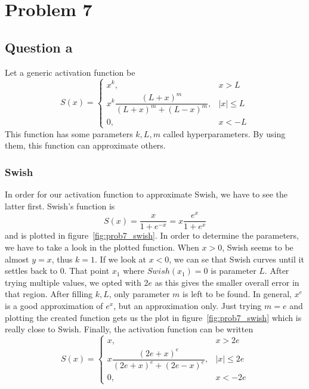\section{Problem 7}
\subsection{Question a}
Let a generic activation function be
\begin{equation}
S(x) = \left\{
\begin{array}{cc}
	x^k, & x>L\\[1mm]
	x^k \dfrac{\left(L+x\right)^m}{\left(L+x\right)^m + \left(L-x\right)^m}, & \left|x\right| \le L\\[1mm]
	0, & x < -L
\end{array}
\right.
\end{equation}
This function has some parameters $k,L,m$ called hyperparameters. By using them, this function can approximate others.

\subsubsection{Swish}
In order for our activation function to approximate Swish, we have to see the latter first.
Swish's function is 
\[
S(x) = \dfrac{x}{1+e^{-x}} = x\dfrac{e^x}{1+e^x}
\]
and is plotted in figure~\ref{fig:prob7_swish}. In order to determine the parameters, we have to take a look in the plotted function. When $x>0$, Swish seems to be almost $y=x$, thus $k=1$. If we look at $x<0$, we can se that Swish curves until it settles back to 0.
That point $x_1$ where $Swish (x_1) = 0$ is parameter $L$. After trying multiple values, we opted with $2e$ as this gives the smaller overall error in that region.
After filling $k,L$, only parameter $m$ is left to be found. In general, $x^e$ is a good approximation of $e^x$, but an approximation only. Just trying $m=e$ and plotting the created function gets us the plot in figure~\ref{fig:prob7_swish} which is really close to Swish.
Finally, the activation function can be written 
\[
S(x) = \left\{
\begin{array}{cc}
	x, & x>2e\\[1mm]
	x \dfrac{\left(2e+x\right)^e}{\left(2e+x\right)^e + \left(2e-x\right)^e}, & \left|x\right| \le 2e\\[1mm]
	0, & x < -2e
\end{array}
\right.
\]

